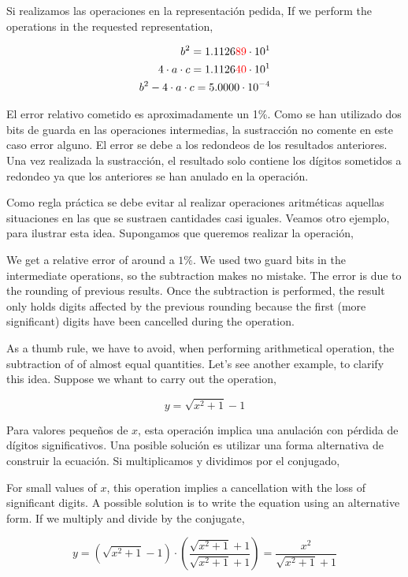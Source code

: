 \begin{paracol}{2}
Si realizamos las operaciones en la representación pedida,
\switchcolumn
If we perform the operations in the requested representation,

\end{paracol}
\begin{align*}
b^2=1.1126{\color{red}89}\cdot10^1\\
4\cdot a\cdot c=1.1126{\color{red}40}\cdot10^1\\
b^2-4\cdot a\cdot c=5.0000\cdot10^{-4}
\end{align*}
\begin{paracol}{2}
El error relativo cometido es aproximadamente un 1\%. Como se han utilizado dos bits de guarda en las operaciones intermedias, la sustracción no comente en este caso error alguno. El error se debe a los redondeos de los resultados anteriores. Una vez realizada la sustracción, el resultado solo contiene los dígitos sometidos a redondeo ya que los anteriores se han anulado en la operación.

Como regla práctica se debe evitar al realizar operaciones aritméticas aquellas situaciones en las que se sustraen cantidades casi iguales. Veamos otro ejemplo, para ilustrar esta idea. Supongamos que queremos realizar la operación,

\switchcolumn
We get a relative error of around a $1\%$. We used two guard bits in the intermediate operations, so the subtraction makes no mistake. The error is due to the rounding of previous results. Once the subtraction is performed, the result only holds digits affected by the previous rounding because the first (more significant) digits have been cancelled during the operation.

As a thumb rule, we have to avoid, when performing arithmetical operation, the subtraction of of almost equal quantities. Let's see another example, to clarify this idea. Suppose we whant to carry out the operation,          
\end{paracol}

\begin{equation*}
y=\sqrt{x^2+1}-1
\end{equation*}
\begin{paracol}{2}
Para valores pequeños de $x$, esta operación implica una anulación con pérdida de dígitos significativos. Una posible solución es utilizar una forma alternativa de construir la ecuación. Si multiplicamos y dividimos por el conjugado,

\switchcolumn
For small values of $x$, this operation implies a cancellation with the loss of significant digits. A possible solution is to write the equation using an alternative form. If we multiply and divide by the conjugate,
\end{paracol}
\begin{equation*}
y=(\sqrt{x^2+1}-1)\cdot\left(\frac{\sqrt{x^2+1}+1}{\sqrt{x^2+1}+1}\right)=\frac{x^2}{\sqrt{x^2+1}+1}
\end{equation*}


